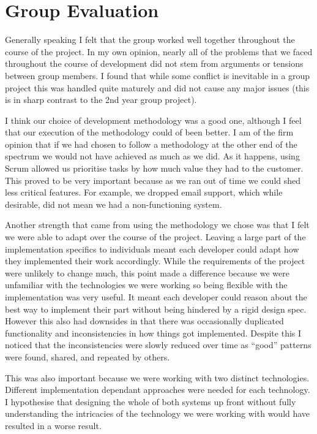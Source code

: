 \documentclass[paper=a4, fontsize=11pt]{scrartcl}	%
\numberwithin{equation}{section}															%
\numberwithin{figure}{section}																%
\numberwithin{table}{section}
\begin{document}
\section*{Group Evaluation}
Generally speaking I felt that the group worked well together throughout the course of the project. In my own opinion, nearly all of the problems that we faced throughout the course of development did not stem from arguments or tensions between group members. I found that while some conflict is inevitable in a group project this was handled quite maturely and did not cause any major issues (this is in sharp contrast to the 2nd year group project). 

I think our choice of development methodology was a good one, although I feel that our execution of the methodology could of been better. I am of the firm opinion that if we had chosen to follow a methodology at the other end of the spectrum we would not have achieved as much as we did. As it happens, using Scrum allowed us prioritise tasks by how much value they had to the customer. This proved to be very important because as we ran out of time we could shed less critical features. For example, we dropped email support, which while desirable, did not mean we had a non-functioning system.

Another strength that came from using the methodology we chose was that I felt we were able to adapt over the course of the project. Leaving a large part of the implementation specifics to individuals meant each developer could adapt how they implemented their work accordingly. While the requirements of the project were unlikely to change much, this point made a difference because we were unfamiliar with the technologies we were working so being flexible with the implementation was very useful. It meant each developer could reason about the best way to implement their part without being hindered by a rigid design spec. However this also had downsides in that there was occasionally duplicated functionality and inconsistencies in how things got implemented. Despite this I noticed that the inconsistencies were slowly reduced over time as ``good'' patterns were found, shared, and repeated by others. 

This was also important because we were working with two distinct technologies. Different implementation dependant approaches were needed for each technology. I hypothesise that designing the whole of both systems up front without fully understanding the intricacies of the technology we were working with would have resulted in a worse result.
\end{document}
